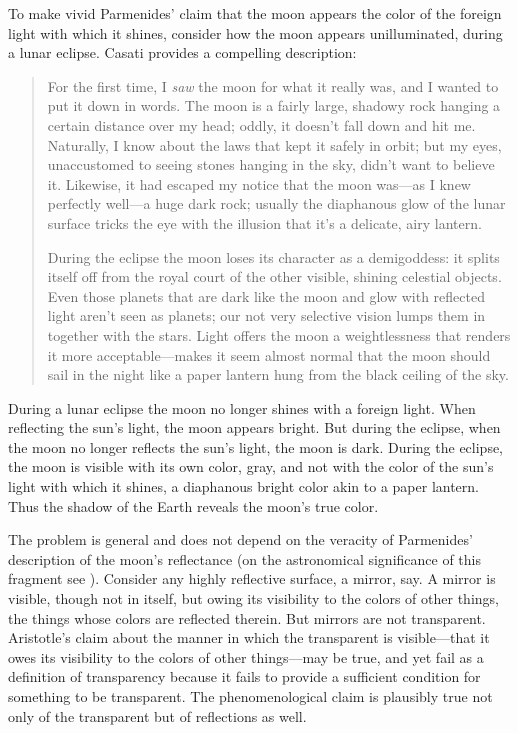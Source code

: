 To make vivid Parmenides' claim that the moon appears the color of the foreign light with which it shines, consider how the moon appears unilluminated, during a lunar eclipse. Casati provides a compelling description:
\begin{quotation}
	For the first time, I \emph{saw} the moon for what it really was, and I wanted to put it down in words. The moon is a fairly large, shadowy rock hanging a certain distance over my head; oddly, it doesn't fall down and hit me. Naturally, I know about the laws that kept it safely in orbit; but my eyes, unaccustomed to seeing stones hanging in the sky, didn't want to believe it. Likewise, it had escaped my notice that the moon was---as I knew perfectly well---a huge dark rock; usually the diaphanous glow of the lunar surface tricks the eye with the illusion that it's a delicate, airy lantern.
	
	During the eclipse the moon loses its character as a demigoddess: it splits itself off from the royal court of the other visible, shining celestial objects. Even those planets that are dark like the moon and glow with reflected light aren't seen as planets; our not very selective vision lumps them in together with the stars. Light offers the moon a weightlessness that renders it more acceptable---makes it seem almost normal that the moon should sail in the night like a paper lantern hung from the black ceiling of the sky. \citep[3--4]{Casati:2003aa}
\end{quotation}
During a lunar eclipse the moon no longer shines with a foreign light. When reflecting the sun's light, the moon appears bright. But during the eclipse, when the moon no longer reflects the sun's light, the moon is dark. During the eclipse, the moon is visible with its own color, gray, and not with the color of the sun's light with which it shines, a diaphanous bright color akin to a paper lantern. Thus the shadow of the Earth reveals the moon's true color.

The problem is general and does not depend on the veracity of Parmenides' description of the moon's reflectance (on the astronomical significance of this fragment see \citealt{Popper:1998aa}). Consider any highly reflective surface, a mirror, say. A mirror is visible, though not in itself, but owing its visibility to the colors of other things, the things whose colors are reflected therein. But mirrors are not transparent. Aristotle's claim about the manner in which the transparent is visible---that it owes its visibility to the colors of other things---may be true, and yet fail as a definition of transparency because it fails to provide a sufficient condition for something to be transparent. The phenomenological claim is plausibly true not only of the transparent but of reflections as well.

